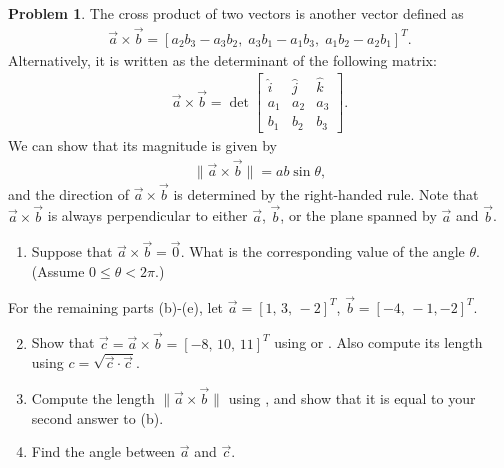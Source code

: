 \documentclass[10pt]{article}
\theoremstyle{definition}
\newtheorem{prob}{Problem}[section]
\newenvironment{subprob}%
{\renewcommand{\theenumi}{\alph{enumi}}\renewcommand{\labelenumi}{(\theenumi)}\begin{enumerate}}%
{\end{enumerate}}%
\begin{document}
\begin{prob}
The cross product of two vectors is another vector defined as
\begin{align}
\vec a \times \vec b = [a_2b_3-a_3b_2,\; a_3b_1-a_1b_3,\; a_1b_2-a_2b_1]^T.\label{eqn:cross1}
\end{align}
Alternatively, it is written as the determinant of the following matrix:
\begin{align}
\vec a \times \vec b = \det
\begin{bmatrix}
\hat i & \hat j & \hat k\\
a_1 & a_2 & a_3\\
b_1 & b_2 & b_3
\end{bmatrix}.\label{eqn:cross2}
\end{align}
We can show that its magnitude is given by
\begin{align}
\| \vec a \times \vec b \| = a b \sin\theta,\label{eqn:cross3}
\end{align}
and the direction of $\vec a \times \vec b$ is determined by the right-handed rule. Note that $\vec a\times \vec b$ is always perpendicular to either $\vec a$, $\vec b$, or the plane spanned by $\vec a$ and $\vec b$.

\begin{subprob}
\item Suppose that $\vec a \times \vec b = \vec 0$. What is the corresponding value of the angle $\theta$. (Assume $0\leq\theta < 2 \pi$.)
\end{subprob}
For the remaining parts (b)-(e), let $\vec a = [1,\,3,\,-2]^T$, $\vec b =[-4,\,-1,-2]^T$. 
\begin{subprob}\setcounter{enumi}{1}
\item Show that $\vec c = \vec a \times \vec b=[-8,\,10,\,11]^T$ using  or . Also compute its length using $c = \sqrt{\vec c \cdot \vec c}$.
\item Compute the length $\| \vec a \times \vec b \|$ using , and show that it is equal to your second answer to (b).
\item Find the angle between $\vec a$ and $\vec c$. 
\end{subprob}
\end{prob}
\end{document}
